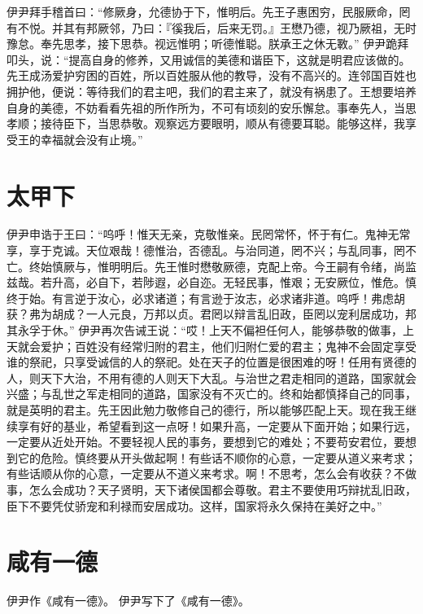 \documentclass[12pt,UTF8]{ctexbook}
\begin{document}
伊尹拜手稽首曰：“修厥身，允德协于下，惟明后。先王子惠困穷，民服厥命，罔有不悦。并其有邦厥邻，乃曰：『徯我后，后来无罚。』王懋乃德，视乃厥祖，无时豫怠。奉先思孝，接下思恭。视远惟明；听德惟聪。朕承王之休无斁。”
伊尹跪拜叩头，说：“提高自身的修养，又用诚信的美德和谐臣下，这就是明君应该做的。先王成汤爱护穷困的百姓，所以百姓服从他的教导，没有不高兴的。连邻国百姓也拥护他，便说：等待我们的君主吧，我们的君主来了，就没有祸患了。王想要培养自身的美德，不妨看看先祖的所作所为，不可有顷刻的安乐懈怠。事奉先人，当思孝顺；接待臣下，当思恭敬。观察远方要眼明，顺从有德要耳聪。能够这样，我享受王的幸福就会没有止境。”

\chapter{太甲下}

伊尹申诰于王曰：“呜呼！惟天无亲，克敬惟亲。民罔常怀，怀于有仁。鬼神无常享，享于克诚。天位艰哉！德惟治，否德乱。与治同道，罔不兴；与乱同事，罔不亡。终始慎厥与，惟明明后。先王惟时懋敬厥德，克配上帝。今王嗣有令绪，尚监兹哉。若升高，必自下，若陟遐，必自迩。无轻民事，惟艰；无安厥位，惟危。慎终于始。有言逆于汝心，必求诸道；有言逊于汝志，必求诸非道。呜呼！弗虑胡获？弗为胡成？一人元良，万邦以贞。君罔以辩言乱旧政，臣罔以宠利居成功，邦其永孚于休。”
伊尹再次告诫王说：“哎！上天不偏袒任何人，能够恭敬的做事，上天就会爱护；百姓没有经常归附的君主，他们归附仁爱的君主；鬼神不会固定享受谁的祭祀，只享受诚信的人的祭祀。处在天子的位置是很困难的呀！任用有贤德的人，则天下大治，不用有德的人则天下大乱。与治世之君走相同的道路，国家就会兴盛；与乱世之军走相同的道路，国家没有不灭亡的。终和始都慎择自己的同事，就是英明的君主。先王因此勉力敬修自己的德行，所以能够匹配上天。现在我王继续享有好的基业，希望看到这一点呀！如果升高，一定要从下面开始；如果行远，一定要从近处开始。不要轻视人民的事务，要想到它的难处；不要苟安君位，要想到它的危险。慎终要从开头做起啊！有些话不顺你的心意，一定要从道义来考求；有些话顺从你的心意，一定要从不道义来考求。啊！不思考，怎么会有收获？不做事，怎么会成功？天子贤明，天下诸侯国都会尊敬。君主不要使用巧辩扰乱旧政，臣下不要凭仗骄宠和利禄而安居成功。这样，国家将永久保持在美好之中。”

\chapter{咸有一德}

伊尹作《咸有一德》。
伊尹写下了《咸有一德》。
\end{document}
